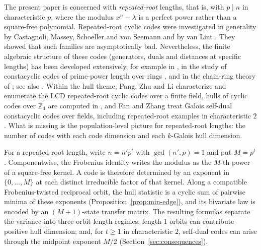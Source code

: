\documentclass[preprint,12pt,a4paper]{elsarticle}
\theoremstyle{definition}
\theoremstyle{remark}
\begin{document}
The present paper is concerned with \emph{repeated-root} lengths, that is,
with $p\mid n$ in characteristic $p$, where the modulus $x^n-\lambda$ is a
perfect power rather than a square-free polynomial. Repeated-root cyclic
codes were investigated in generality by Castagnoli, Massey, Schoeller and
von Seemann \cite{castagnoli1991} and by van Lint \cite{vanLint1991}. They
showed that such families are asymptotically bad. Nevertheless, the finite
algebraic structure of these codes (generators, duals and distances at
specific lengths) has been developed extensively, for example in
\cite{dinh2012}, in the study of constacyclic codes of prime-power length over
rings \cite{dinhai2010}, and in the chain-ring theory of
\cite{dinhLopezPermouth2004}; see also \cite{nortonSalagean2000}. Within the hull theme,
Pang, Zhu and Li \cite{pangZhuLi2018} characterize and enumerate the LCD
repeated-root cyclic codes over a finite field, hulls of cyclic codes over $\mathbb{Z}_4$ are computed in
\cite{jitmanZ4}, and Fan and Zhang
\cite{fanZhang2017} treat Galois self-dual constacyclic codes over fields,
including repeated-root examples in characteristic $2$. What is missing is
the population-level picture for repeated-root lengths: the number of codes
with each code dimension and each $k$-Galois hull dimension.

For a repeated-root length, write $n=n'p^t$ with $\gcd(n',p)=1$ and put
$M=p^t$. Componentwise, the Frobenius identity writes the modulus as the
$M$-th power of a square-free kernel. A code is therefore determined by an
exponent in $\{0,\dots,M\}$ at each distinct irreducible factor of that
kernel. Along a compatible Frobenius-twisted reciprocal orbit, the hull
statistic is a cyclic sum of pairwise minima of these exponents
(Proposition~\ref{prop:min-edge}), and its bivariate law is encoded by an
$(M+1)$-state transfer matrix. The resulting formulas separate the variance
into three orbit-length regimes; length-$1$ orbits can contribute positive
hull dimension; and, for $t\geq1$ in characteristic $2$, self-dual codes can
arise through the midpoint exponent $M/2$
(Section~\ref{sec:consequences}).
\end{document}
